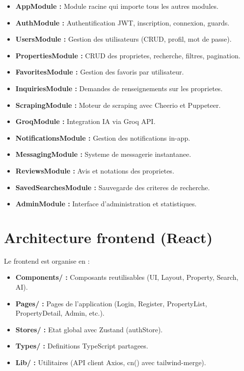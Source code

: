 \documentclass[12pt,a4paper]{report}
\begin{document}
\begin{itemize}
  \item \textbf{AppModule :} Module racine qui importe tous les autres modules.
  \item \textbf{AuthModule :} Authentification JWT, inscription, connexion, guards.
  \item \textbf{UsersModule :} Gestion des utilisateurs (CRUD, profil, mot de passe).
  \item \textbf{PropertiesModule :} CRUD des proprietes, recherche, filtres, pagination.
  \item \textbf{FavoritesModule :} Gestion des favoris par utilisateur.
  \item \textbf{InquiriesModule :} Demandes de renseignements sur les proprietes.
  \item \textbf{ScrapingModule :} Moteur de scraping avec Cheerio et Puppeteer.
  \item \textbf{GroqModule :} Integration IA via Groq API.
  \item \textbf{NotificationsModule :} Gestion des notifications in-app.
  \item \textbf{MessagingModule :} Systeme de messagerie instantanee.
  \item \textbf{ReviewsModule :} Avis et notations des proprietes.
  \item \textbf{SavedSearchesModule :} Sauvegarde des criteres de recherche.
  \item \textbf{AdminModule :} Interface d'administration et statistiques.
\end{itemize}

\section{Architecture frontend (React)}

Le frontend est organise en :

\begin{itemize}
  \item \textbf{Components/ :} Composants reutilisables (UI, Layout, Property, Search, AI).
  \item \textbf{Pages/ :} Pages de l'application (Login, Register, PropertyList, PropertyDetail, Admin, etc.).
  \item \textbf{Stores/ :} Etat global avec Zustand (authStore).
  \item \textbf{Types/ :} Definitions TypeScript partagees.
  \item \textbf{Lib/ :} Utilitaires (API client Axios, cn() avec tailwind-merge).
\end{itemize}
\end{document}
